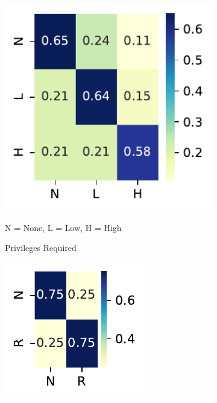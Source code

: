 \documentclass[12pt]{article}
\begin{document}
\begin{figure}[H]
	\begin{subfigure}[t]{0.45\textwidth}
		\includegraphics[width=\textwidth]{./figures/confusion_matrices/privileges_required_mitre.pdf}
		\caption{Privileges Required}
		\begin{tablenotes}
			\footnotesize
			\item \quad N = None, L = Low, H = High
		\end{tablenotes}
	\end{subfigure}
	\hfill
	\begin{subfigure}[t]{0.45\textwidth}
		\includegraphics[width=\textwidth]{./figures/confusion_matrices/user_interaction_mitre.pdf}

\end{subfigure}
\end{figure}
\end{document}

